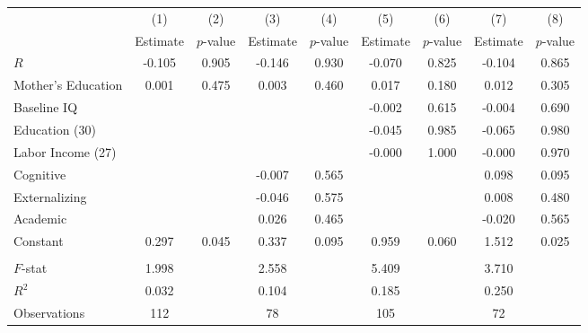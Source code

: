 \begin{tabular}{lcccccccc} \toprule
 & (1) & (2) & (3) & (4) & (5) & (6) & (7) & (8) \\ 
 & Estimate  & $p$-value  & Estimate  & $p$-value  & Estimate  & $p$-value  & Estimate  & $p$-value  \\  \midrule
$R$ &    -0.105 &     0.905 &    -0.146 &     0.930 &    -0.070 &     0.825 &    -0.104 &     0.865 \\  
Mother's Education &     0.001 &     0.475 &     0.003 &     0.460 &     0.017 &     0.180 &     0.012 &     0.305 \\  
Baseline IQ &         &         &         &         &    -0.002 &     0.615 &    -0.004 &     0.690 \\  
Education (30) &         &         &         &         &    -0.045 &     0.985 &    -0.065 &     0.980 \\  
Labor Income (27) &         &         &         &         &    -0.000 &     1.000 &    -0.000 &     0.970 \\  
Cognitive &         &         &    -0.007 &     0.565 &         &         &     0.098 &     0.095 \\  
Externalizing &         &         &    -0.046 &     0.575 &         &         &     0.008 &     0.480 \\  
Academic &         &         &     0.026 &     0.465 &         &         &    -0.020 &     0.565 \\  
Constant &     0.297 &     0.045 &     0.337 &     0.095 &     0.959 &     0.060 &     1.512 &     0.025 \\ \\ \midrule
$F$-stat &     1.998 &         &     2.558 &         &     5.409 &         &     3.710 &         \\  
$R^2$ &     0.032 &         &     0.104 &         &     0.185 &         &     0.250 &         \\  
Observations &   112 &         &    78 &         &   105 &         &    72 &         \\  
\bottomrule
\end{tabular}

